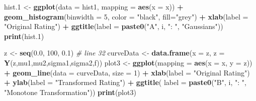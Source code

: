 \documentclass[
]{book}
\newenvironment{Shaded}{\begin{snugshade}}{\end{snugshade}}
\newcommand{\CommentTok}[1]{\textcolor[rgb]{0.56,0.35,0.01}{\textit{#1}}}
\newcommand{\DataTypeTok}[1]{\textcolor[rgb]{0.13,0.29,0.53}{#1}}
\newcommand{\DecValTok}[1]{\textcolor[rgb]{0.00,0.00,0.81}{#1}}
\newcommand{\FloatTok}[1]{\textcolor[rgb]{0.00,0.00,0.81}{#1}}
\newcommand{\KeywordTok}[1]{\textcolor[rgb]{0.13,0.29,0.53}{\textbf{#1}}}
\newcommand{\NormalTok}[1]{#1}
\newcommand{\OperatorTok}[1]{\textcolor[rgb]{0.81,0.36,0.00}{\textbf{#1}}}
\newcommand{\StringTok}[1]{\textcolor[rgb]{0.31,0.60,0.02}{#1}}
\begin{document}
\begin{Shaded}
\begin{Highlighting}[]
\NormalTok{  hist}\FloatTok{.1}\NormalTok{ \textless{}{-}}\StringTok{  }
\StringTok{    }\KeywordTok{ggplot}\NormalTok{(}\DataTypeTok{data =}\NormalTok{ hist1, }\DataTypeTok{mapping =} \KeywordTok{aes}\NormalTok{(}\DataTypeTok{x =}\NormalTok{ x)) }\OperatorTok{+}
\StringTok{    }\KeywordTok{geom\_histogram}\NormalTok{(}\DataTypeTok{binwidth =} \DecValTok{5}\NormalTok{, }\DataTypeTok{color =} \StringTok{"black"}\NormalTok{, }\DataTypeTok{fill=}\StringTok{"grey"}\NormalTok{) }\OperatorTok{+}\StringTok{ }
\StringTok{    }\KeywordTok{xlab}\NormalTok{(}\DataTypeTok{label =} \StringTok{"Original Rating"}\NormalTok{) }\OperatorTok{+}\StringTok{ }
\StringTok{    }\KeywordTok{ggtitle}\NormalTok{(}\DataTypeTok{label =} \KeywordTok{paste0}\NormalTok{(}\StringTok{"A"}\NormalTok{, i, }\StringTok{": "}\NormalTok{, }\StringTok{"Gaussians"}\NormalTok{))}
  \KeywordTok{print}\NormalTok{(hist}\FloatTok{.1}\NormalTok{)}
  
\NormalTok{  z \textless{}{-}}\StringTok{ }\KeywordTok{seq}\NormalTok{(}\FloatTok{0.0}\NormalTok{, }\DecValTok{100}\NormalTok{, }\FloatTok{0.1}\NormalTok{) }\CommentTok{\# line 32}
\NormalTok{  curveData \textless{}{-}}\StringTok{ }
\StringTok{    }\KeywordTok{data.frame}\NormalTok{(}\DataTypeTok{x =}\NormalTok{ z, }
               \DataTypeTok{z =}  \KeywordTok{Y}\NormalTok{(z,mu1,mu2,sigma1,sigma2,f))}
\NormalTok{  plot3 \textless{}{-}}\StringTok{ }
\StringTok{    }\KeywordTok{ggplot}\NormalTok{(}\DataTypeTok{mapping =} \KeywordTok{aes}\NormalTok{(}\DataTypeTok{x =}\NormalTok{ x, }\DataTypeTok{y =}\NormalTok{ z)) }\OperatorTok{+}\StringTok{ }
\StringTok{    }\KeywordTok{geom\_line}\NormalTok{(}\DataTypeTok{data =}\NormalTok{ curveData, }\DataTypeTok{size =} \DecValTok{1}\NormalTok{) }\OperatorTok{+}
\StringTok{    }\KeywordTok{xlab}\NormalTok{(}\DataTypeTok{label =} \StringTok{"Original Rating"}\NormalTok{) }\OperatorTok{+}
\StringTok{    }\KeywordTok{ylab}\NormalTok{(}\DataTypeTok{label =} \StringTok{"Transformed Rating"}\NormalTok{) }\OperatorTok{+}\StringTok{ }
\StringTok{    }\KeywordTok{ggtitle}\NormalTok{(}
      \DataTypeTok{label =} \KeywordTok{paste0}\NormalTok{(}\StringTok{"B"}\NormalTok{, i, }\StringTok{": "}\NormalTok{, }
                     \StringTok{"Monotone Transformation"}\NormalTok{))}
  \KeywordTok{print}\NormalTok{(plot3)}
  

\end{Highlighting}
\end{Shaded}
\end{document}
